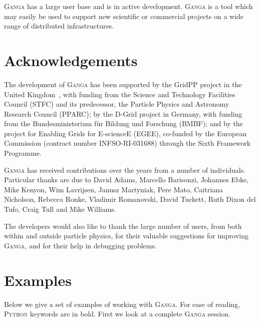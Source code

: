 \documentclass{elsart}
\def\ganga {\textsc{Ganga}\xspace}
\def\python {\textsc{Python}\xspace}
\begin{document}
\ganga has a large user base and is in active development. \ganga is a tool which may easily
be used to support new scientific or commercial projects on a wide range of distributed
infrastructures.

\section{Acknowledgements}
\label{sec:acknowledgements}
The development of \ganga has been supported by the GridPP project in the
United Kingdom~\cite{Faulkner:2006px}, with funding from the Science and Technology
Facilities Council (STFC) and its predecessor, the Particle Physics and
Astronomy Research Council (PPARC); by the D-Grid project in Germany,
with funding from the Bundesministerium f\"ur Bildung und Forschung
(BMBF); and by the project for Enabling Grids for E-scienceE (EGEE),   
co-funded by the European Commission (contract number INFSO-RI-031688) through the Sixth
Framework Programme.

\ganga has received contributions over the years from a number of
individuals.  Particular thanks are due to 
David Adams, Marcello Barisonzi, Johannes Ebke, 
Mike Kenyon, Wim Lavrijsen, Janusz Martyniak, Pere Mato, Caitriana Nicholson, 
Rebecca Ronke, Vladimir Romanovski, David Tuckett, Ruth Dixon del Tufo, 
Craig Tull and Mike Williams.

The developers would also like to thank the large number of users, from both
within and outside particle physics, for their valuable suggestions for
improving \ganga, and for their help in debugging problems.


\appendix

\section{Examples}
\label{sec:examples}
Below we give a set of examples of working with \ganga. For ease of reading,
\python keywords are in bold. First we look at a complete \ganga session.
\vspace{-2ex}
\end{document}
